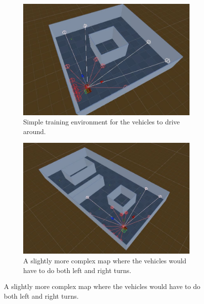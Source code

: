 \begin{figure}[!htbp] 
\centering
\begin{minipage}[t]{.45\textwidth}
\centering
\begin{subfigure}{\textwidth}
        \includegraphics[width=\linewidth, left]{06_Implementation/00_MLAgents/Images/MLMap1.JPG}
        \caption[Training environment map 1]{Simple training environment for the vehicles to drive around.}
        \label{06:fig:MLMap1}
    \end{subfigure}
\end{minipage}
\qquad
\begin{minipage}[t]{.45\textwidth}
    \centering
    \begin{subfigure}{\textwidth}
        \includegraphics[width=\linewidth, right]{06_Implementation/00_MLAgents/Images/MLMap2.JPG}
        \caption[Training environment map 2]{A slightly more complex map where the vehicles would have to do both left and right turns.}
        \label{06:fig:MLMap2}
    \end{subfigure}
\end{minipage}
\end{figure}


